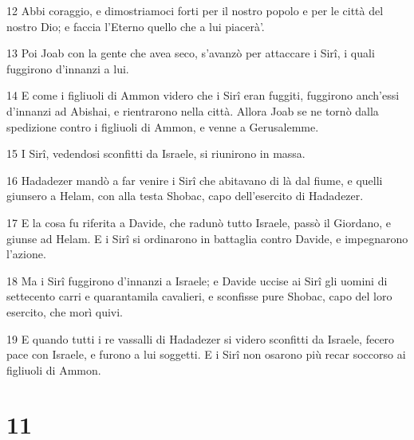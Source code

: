 \par 12 Abbi coraggio, e dimostriamoci forti per il nostro popolo e per le città del nostro Dio; e faccia l'Eterno quello che a lui piacerà'.
\par 13 Poi Joab con la gente che avea seco, s'avanzò per attaccare i Sirî, i quali fuggirono d'innanzi a lui.
\par 14 E come i figliuoli di Ammon videro che i Sirî eran fuggiti, fuggirono anch'essi d'innanzi ad Abishai, e rientrarono nella città. Allora Joab se ne tornò dalla spedizione contro i figliuoli di Ammon, e venne a Gerusalemme.
\par 15 I Sirî, vedendosi sconfitti da Israele, si riunirono in massa.
\par 16 Hadadezer mandò a far venire i Sirî che abitavano di là dal fiume, e quelli giunsero a Helam, con alla testa Shobac, capo dell'esercito di Hadadezer.
\par 17 E la cosa fu riferita a Davide, che radunò tutto Israele, passò il Giordano, e giunse ad Helam. E i Sirî si ordinarono in battaglia contro Davide, e impegnarono l'azione.
\par 18 Ma i Sirî fuggirono d'innanzi a Israele; e Davide uccise ai Sirî gli uomini di settecento carri e quarantamila cavalieri, e sconfisse pure Shobac, capo del loro esercito, che morì quivi.
\par 19 E quando tutti i re vassalli di Hadadezer si videro sconfitti da Israele, fecero pace con Israele, e furono a lui soggetti. E i Sirî non osarono più recar soccorso ai figliuoli di Ammon.

\chapter{11}

